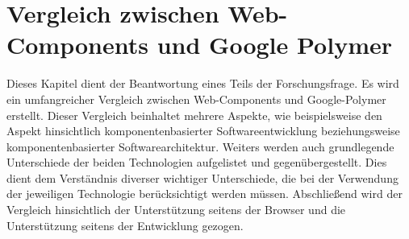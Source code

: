 \section{Vergleich zwischen Web-Components und Google Polymer}
\label{sec:5_Vergleich_WC_Polymer}

Dieses Kapitel dient der Beantwortung eines Teils der Forschungsfrage. Es wird ein umfangreicher Vergleich zwischen Web-Components und Google-Polymer erstellt. Dieser Vergleich beinhaltet mehrere Aspekte, wie beispielsweise den Aspekt hinsichtlich komponentenbasierter Softwareentwicklung beziehungsweise komponentenbasierter Softwarearchitektur. Weiters werden auch grundlegende Unterschiede der beiden Technologien aufgelistet und gegenübergestellt. Dies dient dem Verständnis diverser wichtiger Unterschiede, die bei der Verwendung der jeweiligen Technologie berücksichtigt werden müssen. Abschließend wird der Vergleich hinsichtlich der Unterstützung seitens der Browser und die Unterstützung seitens der Entwicklung gezogen.